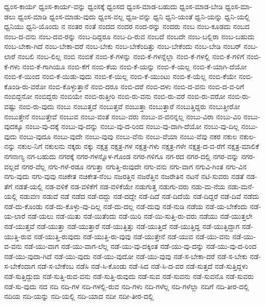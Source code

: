 {ಧ್ವಂಸ-ಕಾರ್ಯ
ಧ್ವಂಸ-ಕಾರ್ಯ-ವನ್ನು
ಧ್ವಂಸಕ್ಕೆ
ಧ್ವಂಸದ
ಧ್ವಂಸ-ಮಾಡ-ಬಹುದು
ಧ್ವಂಸ-ಮಾಡ-ಬೇಡಿ
ಧ್ವಂಸ-ಮಾ-ಡಲು
ಧ್ವಂಸ-ಮಾಡಿ
ಧ್ವಂಸ-ಮಾಡು-ವುದು
ಧ್ವಂಸ-ವಲ್ಲ
ಧ್ವಜ-ವನ್ನು
ಧ್ವನಿ
ಧ್ವನಿ-ಯಂತೆ
ಧ್ವನಿ-ಯನ್ನು
ಧ್ವನಿ-ಯಲ್ಲಿ
ಧ್ವನಿಯು
ಧ್ವನಿ-ಯೊಂದು
ನ
ನಂತರ
ನಂತೆ
ನಂದದ
ನಂದರ
ನಂದ-ರನ್ನು
ನಂದರು
ನಂಬ
ನಂಬ-ಕೂಡದು
ನಂಬದ
ನಂಬ-ದ-ವನು
ನಂಬ-ದವ-ರನ್ನು
ನಂಬ-ದಿದ್ದರೂ
ನಂಬ-ದಿ-ರುವ
ನಂಬದೆ
ನಂಬದೇ
ನಂಬ-ಬಲ್ಲಿರಾ
ನಂಬ-ಬಹುದು
ನಂಬ-ಬೇಕಾ-ಗಿದೆ
ನಂಬ-ಬೇಕಾ-ದರೆ
ನಂಬ-ಬೇಕು
ನಂಬ-ಬೇಕೆಂದಿತ್ತು
ನಂಬ-ಬೇಕೆಂದು
ನಂಬ-ಬೇಡಿ
ನಂಬರ್
ನಂಬ-ಲಾರೆ
ನಂಬಲಿ
ನಂಬ-ಲಿಲ್ಲ
ನಂಬಿ
ನಂಬಿಕೆ
ನಂಬಿ-ಕೆ-ಗಳನ್ನು
ನಂಬಿ-ಕೆ-ಗಳನ್ನೆಲ್ಲಾ
ನಂಬಿ-ಕೆ-ಗಳಲ್ಲಿ
ನಂಬಿ-ಕೆ-ಗಳಿಗೆ
ನಂಬಿ-ಕೆ-ಗಳು
ನಂಬಿ-ಕೆ-ಗಾಗಿಯೂ
ನಂಬಿ-ಕೆಗೆ
ನಂಬಿ-ಕೆಯ
ನಂಬಿ-ಕೆ-ಯನ್ನು
ನಂಬಿ-ಕೆ-ಯಲ್ಲ
ನಂಬಿ-ಕೆ-ಯಾಗಿ-ದೆಯೋ
ನಂಬಿ-ಕೆ-ಯಿಂದ
ನಂಬಿ-ಕೆ-ಯಿಡು-ವುದು
ನಂಬಿ-ಕೆ-ಯಿಲ್ಲ
ನಂಬಿ-ಕೆ-ಯುಂಟು
ನಂಬಿ-ಕೆ-ಯೆಲ್ಲ
ನಂಬಿ-ಕೆಯೇ
ನಂಬಿ-ಕೊಂಡಿ-ರು-ವರೋ
ನಂಬಿ-ಕೊಳ್ಳುತ್ತಾನೆ
ನಂಬಿ-ದರೂ
ನಂಬಿ-ದರೆ
ನಂಬಿ-ದಳು
ನಂಬಿ-ದ-ವನು
ನಂಬಿ-ದ-ವ-ರಿಗೆ
ನಂಬಿದ್ದನೋ
ನಂಬಿದ್ದರು
ನಂಬಿಯೇ
ನಂಬಿ-ರುತ್ತೀರಿ
ನಂಬಿ-ರು-ವನು
ನಂಬಿ-ರು-ವರೆ
ನಂಬಿ-ರು-ವರೋ
ನಂಬಿ-ರು-ವಷ್ಟು
ನಂಬಿ-ರು-ವುದು
ನಂಬು
ನಂಬುತ್ತದೆ
ನಂಬುತ್ತವೆ
ನಂಬುತ್ತಾ
ನಂಬುತ್ತಾರೆ
ನಂಬುತ್ತಿದ್ದರು
ನಂಬುತ್ತೀರೋ
ನಂಬುತ್ತೇನೆ
ನಂಬುತ್ತೇವೆ
ನಂಬುವ
ನಂಬು-ವಂತೆ
ನಂಬು-ವರು
ನಂಬು-ವ-ವನನ್ನಲ್ಲ
ನಂಬು-ವಿರಾ
ನಂಬು-ವಿರಿ
ನಂಬು-ವುದಕ್ಕೂ
ನಂಬು-ವು-ದಕ್ಕೆ
ನಂಬು-ವು-ದನ್ನು
ನಂಬು-ವು-ದ-ರಿಂದ
ನಂಬು-ವು-ದಾಗಿ-ದೆಯೋ
ನಂಬು-ವು-ದಿಲ್ಲ
ನಂಬು-ವುದು
ನಂಬು-ವುದೂ
ನಂಬು-ವುದೇ
ನಂಬು-ವುವು
ನಂಬು-ವೆನು
ನಂಬು-ವೆಯಾ
ನಂಬು-ವೆವು
ನಕರ
ನಕುಲ
ನಕುಲ-ನನ್ನು
ನಕುಲ-ನಿಗೆ
ನಕುಲನು
ನಕ್ಕರು
ನಕ್ಕು
ನಕ್ಷತ್ರ
ನಕ್ಷತ್ರ-ಗಳ
ನಕ್ಷತ್ರ-ಗಳು
ನಕ್ಷತ್ರ-ಗಳೇ
ನಕ್ಷತ್ರ-ದ-ವ-ರೆಗೆ
ನಕ್ಷತ್ರ-ಮಾಲಿಕೆ
ನಗನಾಣ್ಯ
ನಗ-ಬಹುದು
ನಗರಕ್ಕೆ
ನಗರ-ಗಳನ್ನೊಳ-ಗೊಂಡ
ನಗರ-ಗಳಿಗೂ
ನಗ-ರದ
ನಗರ-ದಲ್ಲಿ
ನಗರ-ವನ್ನು
ನಗರ-ವಲ್ಲದೆ
ನಗರ-ವೆಲ್ಲ
ನಗು-ಗಳೆ-ರಡೂ
ನಗುತ್ತಾ
ನಗುತ್ತಿ-ರುವುದೇ
ನಗು-ವನು
ನಗು-ವಾಗ
ನಗುವಿ-ಗಿಂತ
ನಗು-ವಿನ
ನಗು-ವುದು
ನಗು-ವುವು
ನಚಿಕೇತ
ನಚಿಕೇತ-ನೆಂಬ
ನಜರತ್ತಿನ
ನಜರೆತ್ತಿನ
ನಜರೇತಿನ
ನಟನೆ
ನಟಿ-ಸುವರು
ನಡತೆ
ನಡ-ತೆಗೆ
ನಡತೆ-ಯಲ್ಲಿ
ನಡ-ವಳಿಕೆ
ನಡ-ವಳಿಕೆಗೆ
ನಡ-ವಳಿಕೆಯೇ
ನಡುಗುತ್ತ
ನಡುಗು-ವರು
ನಡು-ಮ-ನೆಯ
ನಡು-ಮನೆ-ಯಲ್ಲಿ
ನಡುವಣ
ನಡುವೆ
ನಡೆ
ನಡೆದ
ನಡೆ-ದದ್ದು
ನಡೆ-ದದ್ದೇ
ನಡೆ-ದಿದೆ
ನಡೆ-ದಿದೆಯೆ
ನಡೆ-ದಿದ್ದರೆ
ನಡೆ-ದಿವೆ
ನಡೆದು
ನಡೆ-ದು-ಕೊಂಡು
ನಡೆ-ದು-ಕೊಳ್ಳು-ವು-ದಿಲ್ಲ
ನಡೆ-ದು-ದಲ್ಲ
ನಡೆ-ದುವು
ನಡೆ-ನುಡಿ
ನಡೆಯ
ನಡೆ-ಯ-ಬೇಕೆಂದು
ನಡೆ-ಯ-ಲಾರೆ
ನಡೆ-ಯಲು
ನಡೆ-ಯಿತು
ನಡೆ-ಯಿತೆಂದು
ನಡೆ-ಯಿರಿ
ನಡೆ-ಯಿ-ಸುತ್ತಿ-ರು-ವರು
ನಡೆಯು
ನಡೆ-ಯುತ್ತಲೇ
ನಡೆ-ಯುತ್ತವೆ
ನಡೆ-ಯುತ್ತಾ
ನಡೆ-ಯುತ್ತಾರೆ
ನಡೆ-ಯುತ್ತಿತ್ತು
ನಡೆ-ಯುತ್ತಿದೆ
ನಡೆ-ಯುತ್ತಿದ್ದ
ನಡೆ-ಯುತ್ತಿದ್ದಾಗ
ನಡೆ-ಯುತ್ತಿ-ರುವ
ನಡೆ-ಯುತ್ತಿ-ರುವುದು
ನಡೆ-ಯುತ್ತಿ-ರು-ವುವು
ನಡೆ-ಯುತ್ತೇನೆ
ನಡೆ-ಯುವ
ನಡೆ-ಯು-ವನು
ನಡೆ-ಯು-ವ-ವನು
ನಡೆ-ಯು-ವಾಗ
ನಡೆ-ಯು-ವಾಗ-ಲೆಲ್ಲ
ನಡೆ-ಯು-ವು-ದಕ್ಕಿಂತ
ನಡೆ-ಯು-ವು-ದನ್ನು
ನಡೆ-ಯು-ವು-ದ-ರಿಂದ
ನಡೆ-ಯು-ವುದಾ-ಗಿದೆ
ನಡೆ-ಯು-ವುದು
ನಡೆ-ಯು-ವುದೋ
ನಡೆ-ಯು-ವುವು
ನಡೆ-ಸ-ಬೇಕಾ-ದರೆ
ನಡೆ-ಸ-ಬೇಕು
ನಡೆ-ಸ-ಬೇಕೆಂದಾಗ
ನಡೆ-ಸ-ಬೇಕೆಂಬ
ನಡೆಸಿ
ನಡೆ-ಸಿ-ಕೊಂಡು
ನಡೆ-ಸಿದ
ನಡೆ-ಸಿ-ದ-ವರ
ನಡೆ-ಸುತ್ತದೆ
ನಡೆ-ಸುತ್ತಿದ್ದಳು
ನಡೆ-ಸುತ್ತಿದ್ದುದು
ನಡೆ-ಸುತ್ತಿ-ರುವ-ವನು
ನಡೆ-ಸುತ್ತಿ-ರುವುದು
ನಡೆ-ಸುವ
ನಡೆ-ಸುವನು
ನಡೆ-ಸುವನೊ
ನಡೆ-ಸುವರು
ನಡೆ-ಸು-ವುದು
ನದ
ನದಿ
ನದಿ-ಗಳ
ನದಿ-ಗಳಲ್ಲಿ-ರುವ
ನದಿ-ಗಳು
ನದಿ-ಗಳೆಲ್ಲ
ನದಿ-ಗಳೆಲ್ಲಾ
ನದಿಗೆ
ನದಿ-ತೀರ-ದಲ್ಲಿ
ನದಿಯ
ನದಿ-ಯನ್ನು
ನದಿ-ಯಲ್ಲಿ
ನದಿ-ಯಾದ
ನದೀ
ನದೀ-ತೀರ-ದಲ್ಲಿ
}
